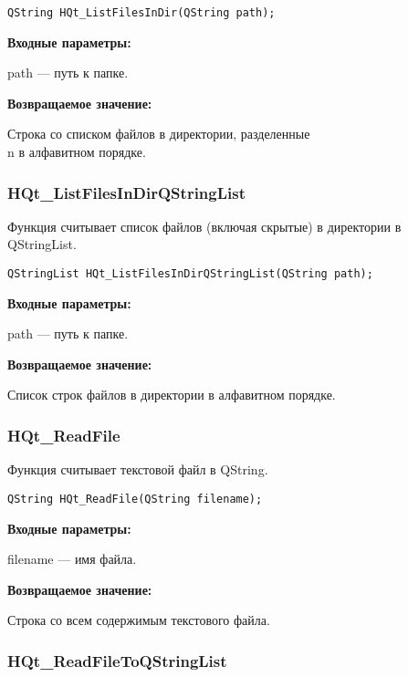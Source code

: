 \documentclass[a4paper,12pt]{article}
\begin{document}
\begin{lstlisting}[label=code_syntax_HQt_ListFilesInDir,caption=Синтаксис]
QString HQt_ListFilesInDir(QString path);
\end{lstlisting}

\textbf{Входные параметры:}

path --- путь к папке.

\textbf{Возвращаемое значение:}

Строка со списком файлов в директории, разделенные \\n в алфавитном порядке.


\subsubsection{HQt\_ListFilesInDirQStringList}\label{HQt_ListFilesInDirQStringList}

Функция считывает список файлов (включая скрытые) в директории в QStringList.


\begin{lstlisting}[label=code_syntax_HQt_ListFilesInDirQStringList,caption=Синтаксис]
QStringList HQt_ListFilesInDirQStringList(QString path);
\end{lstlisting}

\textbf{Входные параметры:}

path --- путь к папке.

\textbf{Возвращаемое значение:}

Список строк файлов в директории в алфавитном порядке.


\subsubsection{HQt\_ReadFile}\label{HQt_ReadFile}

Функция считывает текстовой файл в QString.


\begin{lstlisting}[label=code_syntax_HQt_ReadFile,caption=Синтаксис]
QString HQt_ReadFile(QString filename);
\end{lstlisting}

\textbf{Входные параметры:}

filename --- имя файла.

\textbf{Возвращаемое значение:}

Строка со всем содержимым текстового файла.


\subsubsection{HQt\_ReadFileToQStringList}\label{HQt_ReadFileToQStringList}
\end{document}
